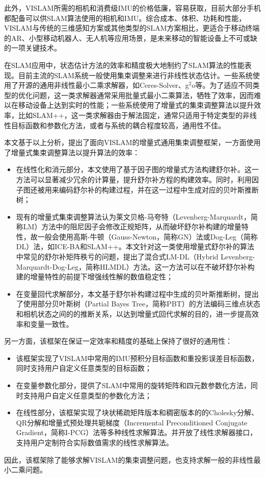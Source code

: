 此外，VISLAM所需的相机和消费级IMU的价格低廉，容易获取，目前大部分手机都配备可以供SLAM算法使用的相机和IMU。综合成本、体积、功耗和性能，VISLAM与传统的三维感知方案或其他类型的SLAM方案相比，更适合于移动终端的AR、小型移动机器人、无人机等应用场景，是未来移动的智能设备上不可或缺的一项关键技术。

在SLAM应用中，状态估计方法的效率和精度极大地制约了SLAM算法的性能表现。目前主流的SLAM系统一般使用集束调整来进行非线性状态估计。一些系统使用了开源的通用非线性最小二乘求解器，如Ceres-Solver\citep{ceres-solver}、g$^2$o\citep{kummerle2011g}等。为了适应不同类型的优化问题，这一类求解器通常采用批量式最小二乘算法，牺牲了效率，因而难以在移动设备上达到实时的性能；一些系统使用了增量式的集束调整算法以提升效率，比如SLAM++\citep{ila2017fast}，这一类求解器由于解法固定，通常只适用于特定类型的非线性目标函数和参数化方法，或者与系统的耦合程度较高，通用性不佳。

本文基于以上分析，提出了面向VISLAM的增量式通用集束调整框架，一方面使用了增量式集束调整算法以提升算法的效率：
\begin{itemize}
    \item 在线性化和消元部分，本文使用了基于因子图的增量式方法构建舒尔补。这一方法可以显著减少冗余的计算量，提升舒尔补方程的构建效率。同时，利用因子图还被用来编码舒尔补的构建过程，并在这一过程中生成对应的贝叶斯推断树；
    \item 现有的增量式集束调整算法认为莱文贝格-马夸特（Levenberg-Marquardt，简称LM）方法中的阻尼因子会修改正规矩阵，从而破坏舒尔补构建的增量特性，故一般会使用高斯-牛顿（Gauss-Newton，简称GN）法或Dog-Leg（简称DL）法，如ICE-BA\citep{liu2018ice}和SLAM++。本文针对这一类使用增量式舒尔补的算法中常见的舒尔补矩阵秩亏的问题，提出了混合式LM-DL（Hybrid Levenberg-Marquardt-Dog-Leg，简称HLMDL）方法。这一方法可以在不破坏舒尔补构建的增量特性的前提下增强线性解的数值稳定性；
    \item 在变量回代求解部分，本文基于舒尔补构建过程中生成的贝叶斯推断树，提出了使用部分贝叶斯树（Partial Bayes Tree，简称PBT）的方法编码三维点状态和相机状态之间的的推断关系，以达到增量式回代求解的目的，进一步提高效率和变量一致性。
\end{itemize}

另一方面，该框架在保证一定效率和精度的基础上保持了很好的通用性：
\begin{itemize}
    \item 该框架实现了VISLAM中常用的IMU预积分\citep{forster2017manifold}目标函数和重投影误差目标函数，同时支持用户自定义任意类型的目标函数；
    \item 在变量参数化部分，提供了SLAM中常用的旋转矩阵和四元数参数化方法，同时支持用户自定义任意类型的参数化方法；
    \item 在线性部分，该框架实现了块状稀疏矩阵版本和稠密版本的的Cholesky分解、QR分解和增量式预处理共轭梯度（Incremental Preconditioned Conjugate Gradient，简称I-PCG）法等多种线性求解算法。并开放了线性求解器接口，支持用户定制符合实际数值需求的线性求解算法。
\end{itemize}
因此，该框架除了能够求解VISLAM的集束调整问题，也支持求解一般的非线性最小二乘问题。


